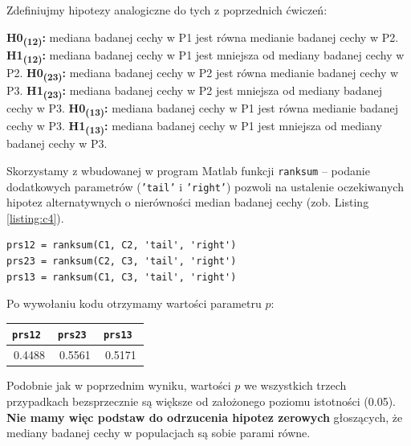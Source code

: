 \documentclass[12pt, a4paper]{article}
\begin{document}
Zdefiniujmy hipotezy analogiczne do tych z poprzednich ćwiczeń:\newline

\noindent
\textbf{H0\textsubscript{(12)}:} mediana badanej cechy w P1 jest równa medianie badanej cechy w P2. \newline
\textbf{H1\textsubscript{(12)}:} mediana badanej cechy w P1 jest mniejsza od mediany badanej cechy w P2. \newline
\textbf{H0\textsubscript{(23)}:} mediana badanej cechy w P2 jest równa medianie badanej cechy w P3. \newline
\textbf{H1\textsubscript{(23)}:} mediana badanej cechy w P2 jest mniejsza od mediany badanej cechy w P3. \newline
\textbf{H0\textsubscript{(13)}:} mediana badanej cechy w P1 jest równa medianie badanej cechy w P3. \newline
\textbf{H1\textsubscript{(13)}:} mediana badanej cechy w P1 jest mniejsza od mediany badanej cechy w P3. \newline

Skorzystamy z wbudowanej w program Matlab funkcji \texttt{ranksum} -- podanie dodatkowych parametrów (\texttt{'tail'} i \texttt{'right'}) pozwoli na ustalenie oczekiwanych hipotez alternatywnych o nierówności median badanej cechy (zob. Listing \ref{listing:c4}).\newline

\begin{lstlisting}[frame=single,label={listing:c4},caption={badanie równości median badanej cechy we wszystkich populacjach.},captionpos=b]
prs12 = ranksum(C1, C2, 'tail', 'right')
prs23 = ranksum(C2, C3, 'tail', 'right')
prs13 = ranksum(C1, C3, 'tail', 'right')
\end{lstlisting}

\noindent Po wywołaniu kodu otrzymamy wartości parametru $p$:

\begin{center}
  \begin{tabular}{|c|c|c|}\hline
    \tt prs12 & \tt prs23 & \tt prs13 \\\hline
    0.4488 & 0.5561 & 0.5171 \\\hline
  \end{tabular}
  \label{table:c4}
\end{center}

Podobnie jak w poprzednim wyniku, wartości $p$ we wszystkich trzech przypadkach bezsprzecznie są większe od założonego poziomu istotności (0.05). \textbf{Nie mamy więc podstaw do odrzucenia hipotez zerowych} głoszących, że mediany badanej cechy w populacjach są sobie parami równe.
\end{document}
